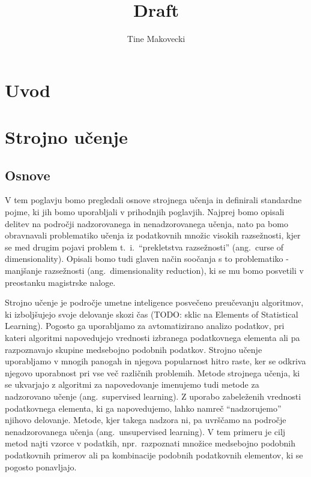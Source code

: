 \documentclass[12pt,a4paper]{article}
\author{Tine Makovecki}
\begin{document}
\title{\LARGE{Draft}}
\maketitle


\pagebreak

\tableofcontents

\pagebreak


\section{Uvod}


\section{Strojno učenje}


\subsection{Osnove}

V tem poglavju bomo pregledali osnove strojnega učenja in definirali standardne pojme, ki jih bomo uporabljali v prihodnjih poglavjih. 
Najprej bomo opisali delitev na področji nadzorovanega in nenadzorovanega učenja, 
nato pa bomo obravnavali problematiko učenja iz podatkovnih množic visokih razsežnosti, 
kjer se med drugim pojavi problem t.~i.~``prekletstva razsežnosti'' (ang.~curse of dimensionality). 
Opisali bomo tudi glaven način soočanja s to problematiko - manjšanje razsežnosti (ang.~dimensionality reduction), ki se mu bomo posvetili v preostanku magistrske naloge.

Strojno učenje je področje umetne inteligence posvečeno preučevanju algoritmov, 
ki izboljšujejo svoje delovanje skozi čas (TODO: sklic na Elements of Statistical Learning). 
Pogosto ga uporabljamo za avtomatizirano analizo podatkov, pri kateri algoritmi napovedujejo vrednosti izbranega podatkovnega elementa ali pa razpoznavajo skupine medsebojno podobnih podatkov. 
Strojno učenje uporabljamo v mnogih panogah in njegova popularnost hitro raste, ker se odkriva njegovo uporabnost pri vse več različnih problemih. 
Metode strojnega učenja, ki se ukvarjajo z algoritmi za napovedovanje imenujemo tudi metode za nadzorovano učenje (ang.~supervised learning). 
Z uporabo zabeleženih vrednosti podatkovnega elementa, ki ga napovedujemo, lahko namreč ``nadzorujemo'' njihovo delovanje. 
Metode, kjer takega nadzora ni, pa uvrščamo na področje nenadzorovanega učenja (ang.~unsupervised learning). 
V tem primeru je cilj metod najti vzorce v podatkih, npr.\ razpoznati množice medsebojno podobnih podatkovnih primerov ali pa kombinacije podobnih podatkovnih elementov, ki se pogosto ponavljajo.
\end{document}
